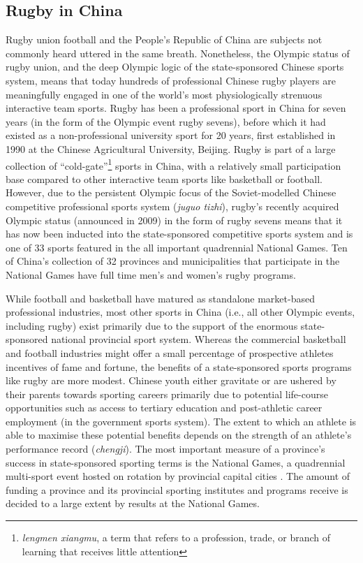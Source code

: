 \subsection{Rugby in China}
Rugby union football and the People's Republic of China are subjects not commonly heard uttered in the same breath.  Nonetheless, the Olympic status of rugby union, and the deep Olympic logic of the state-sponsored Chinese sports system, means that today hundreds of professional Chinese rugby players are meaningfully engaged in one of the world's most physiologically strenuous interactive team sports.  Rugby has been a professional sport in China for seven years (in the form of the Olympic event rugby sevens), before which it had existed as a non-professional university sport for 20 years, first established in 1990 at the Chinese Agricultural University, Beijing. Rugby is part of a large collection of ``cold-gate''\footnote{\textit{lengmen xiangmu}, a term that refers to a profession, trade, or branch of learning that receives little attention} sports in China, with a relatively small participation base compared to other interactive team sports like basketball or football.
However, due to the persistent Olympic focus of the Soviet-modelled Chinese competitive professional sports system (\textit{juguo tizhi}), rugby's recently acquired Olympic status (announced in 2009) in the form of rugby sevens means that it has now been inducted into the state-sponsored competitive sports system and is one of 33 sports featured in the all important quadrennial National Games.  Ten of China's collection of 32 provinces and municipalities that participate in the National Games have full time men's and women's rugby programs.

While football and basketball have matured as standalone market-based professional industries, most other sports in China (i.e., all other Olympic events, including rugby) exist primarily due to the support of the enormous state-sponsored national provincial sport system.  Whereas the commercial basketball and football industries might offer a small percentage of prospective athletes incentives of fame and fortune, the benefits of a state-sponsored sports programs like rugby are more modest.  Chinese youth either gravitate or are ushered by their parents towards  sporting careers primarily due to potential life-course opportunities such as access to tertiary education and post-athletic career employment (in the government sports system).  The extent to which an athlete is able to maximise these potential benefits depends on the strength of an athlete's performance record (\textit{chengji}).
The most important measure of a province's success in state-sponsored sporting terms is the National Games, a quadrennial multi-sport event hosted on rotation by provincial capital cities \citep{Hong2002}.  The amount of funding a province and its provincial sporting institutes and programs receive is decided to a large extent by results at the National Games.

